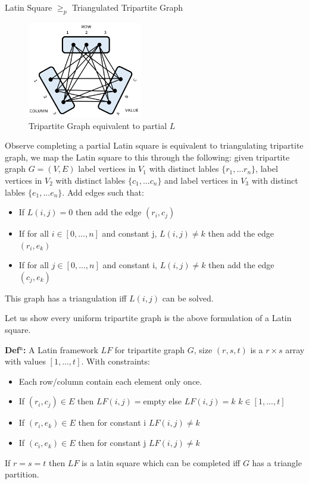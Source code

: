 \documentclass[final]{beamer}
\newlength{\colwidth}
\newcounter{row}
\newcounter{col}
\begin{document}
\begin{frame}[t]
\begin{columns}[t]
\begin{column}{\colwidth}
\begin{block}{Latin Square $\geq_p$ Triangulated Tripartite Graph}
\begin{figure}
		\includegraphics[width=50mm]{ttg.png}
		\caption{Tripartite Graph equivalent to partial $L$}
\end{figure}

Observe completing a partial Latin square is equivalent to triangulating tripartite graph, we map the Latin square to this through the following: 
given tripartite graph $G=(V,E)$ label vertices in $V_1$ with distinct lables $\{r_1,...r_n\}$, label vertices in $V_2$ with distinct lables $\{c_1,...c_n\}$ and label vertices in $V_3$ with distinct lables $\{e_1,...e_n\}$. Add edges such that:

\begin{itemize}
\item{If $L(i,j) = 0$ then add the edge $(r_i,c_j)$ }
\item{If for all $i \in [0,...,n]$ and constant j, $L(i,j) \neq k$ then add the edge $(r_i,e_k)$}
\item{If for all $j \in [0,...,n]$ and constant i, $L(i,j) \neq k$ then add the edge $(c_j,e_k)$}
\end{itemize}
This graph has a triangulation iff $L(i,j)$ can be solved.

Let us show every uniform tripartite graph is the above formulation of a Latin square.

\textbf{Def$^{\text{n}}$:} A Latin framework $LF$ for tripartite graph $G$, size $(r,s,t)$ is a $r \times s$ array with values $[1,...,t]$. With constraints:
\begin{itemize}
\item{Each row/column contain each element only once.}
\item{If $(r_i,c_j)\in E$ then $LF(i,j)=$empty else $LF(i,j)= k$ $k\in [1,...,t]$}
\item{If $(r_i,e_k)\in E$  then for constant i $LF(i,j)\neq k$}
\item{If $(c_i,e_k)\in E$  then for constant j $LF(i,j)\neq k$}
\end{itemize}
If $r=s=t$ then $LF$ is a latin square which can be completed iff $G$ has a triangle partition.


\end{block}
\end{column}
\end{columns}
\end{frame}
\end{document}
